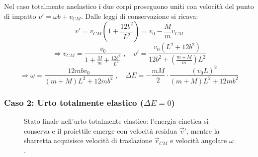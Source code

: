 Nel caso totalmente anelastico i due corpi proseguono uniti con velocità del punto di impatto $v' = \omega b + v_{CM}$. Dalle leggi di conservazione si ricava:
\begin{equation}
    v' = v_{CM} \left( 1 + \frac{12b^2}{L^2} \right) = v_0 - \frac{M}{m} v_{CM}
\end{equation}
\begin{equation}
    \Rightarrow v_{CM} = \frac{v_0}{1 + \frac{M}{m} + \frac{12 b^2}{L^2}} \; , \quad v' = \frac{v_0 (L^2 + 12b^2)}{12b^2 + \left(\frac{m+M}{m}\right) L^2}
\end{equation}
\begin{equation}
    \Rightarrow \omega = \frac{12 m b v_0}{(m+M)L^2 + 12 m b^2} \; , \quad \Delta E = - \frac{m M}{2} \cdot \frac{(v_0 L)^2}{(m+M)L^2 + 12 m b^2}
\end{equation}

\subsubsection{Caso 2: Urto totalmente elastico ($\Delta E = 0$)}
\begin{figure}[ht]
\centering
{}
\caption{Stato finale nell'urto totalmente elastico: l'energia cinetica si conserva e il proiettile emerge con velocità residua $\vec{v}'$, mentre la sbarretta acquisisce velocità di traslazione $\vec{v}_{CM}$ e velocità angolare $\omega$.}
\end{figure}

